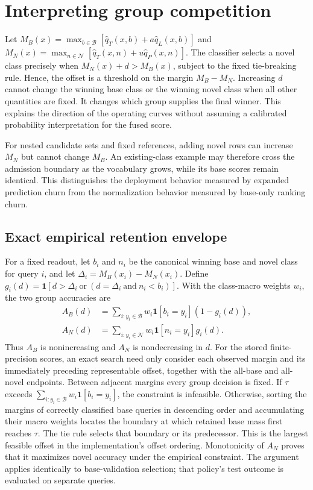 \documentclass[preprint,review,12pt]{elsarticle}
\begin{document}
\section{Interpreting group competition}
Let $M_B(x)=\max_{b\in\mathcal B}[\widehat q_T(x,b)+a\widehat q_L(x,b)]$ and $M_N(x)=\max_{n\in\mathcal N}[\widehat q_T(x,n)+u\widehat q_P(x,n)]$. The classifier selects a novel class precisely when $M_N(x)+d>M_B(x)$, subject to the fixed tie-breaking rule. Hence, the offset is a threshold on the margin $M_B-M_N$. Increasing $d$ cannot change the winning base class or the winning novel class when all other quantities are fixed. It changes which group supplies the final winner. This explains the direction of the operating curves without assuming a calibrated probability interpretation for the fused score.

For nested candidate sets and fixed references, adding novel rows can increase $M_N$ but cannot change $M_B$. An existing-class example may therefore cross the admission boundary as the vocabulary grows, while its base scores remain identical. This distinguishes the deployment behavior measured by expanded prediction churn from the normalization behavior measured by base-only ranking churn.

\FloatBarrier
\subsection{Exact empirical retention envelope}
For a fixed readout, let $b_i$ and $n_i$ be the canonical winning base and novel
class for query $i$, and let $\Delta_i=M_B(x_i)-M_N(x_i)$. Define
$g_i(d)=\mathbf 1[d>\Delta_i\ \text{or}\ (d=\Delta_i\ \text{and}\ n_i<b_i)]$.
With the class-macro weights $w_i$, the two group accuracies are
\begin{align}
 A_B(d)&=\sum_{i:y_i\in\mathcal B}w_i\mathbf 1[b_i=y_i](1-g_i(d)),\\
 A_N(d)&=\sum_{i:y_i\in\mathcal N}w_i\mathbf 1[n_i=y_i]g_i(d).
\end{align}
Thus $A_B$ is nonincreasing and $A_N$ is nondecreasing in $d$.
For the stored finite-precision scores, an exact search need only consider each
observed margin and its immediately preceding representable offset, together
with the all-base and all-novel endpoints. Between adjacent margins every group
decision is fixed. If $\tau$ exceeds
$\sum_{i:y_i\in\mathcal B}w_i\mathbf 1[b_i=y_i]$, the constraint is infeasible.
Otherwise, sorting the margins of correctly classified base queries in descending
order and accumulating their macro weights locates the boundary at which retained
base mass first reaches $\tau$. The tie rule selects that boundary or its
predecessor. This is the largest feasible offset in the implementation's offset
ordering. Monotonicity of $A_N$ proves that it maximizes novel accuracy under the
empirical constraint. The argument applies identically to base-validation
selection; that policy's test outcome is evaluated on separate queries.
\end{document}
